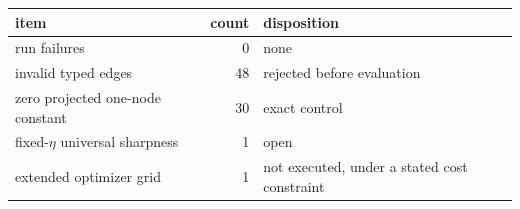 \begin{tabular}{@{}lrl@{}}
\toprule
item & count & disposition \\
\midrule
run failures & 0 & none \\ 
invalid typed edges & 48 & rejected before evaluation \\ 
zero projected one-node constant & 30 & exact control \\ 
fixed-$\eta$ universal sharpness & 1 & open \\ 
extended optimizer grid & 1 & not executed, under a stated cost constraint \\ 
\bottomrule
\end{tabular}

